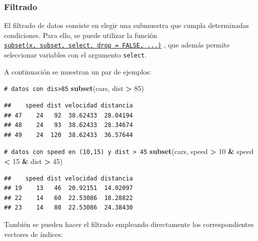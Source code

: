 \documentclass[
]{book}
\newenvironment{Shaded}{\begin{snugshade}}{\end{snugshade}}
\newcommand{\CommentTok}[1]{\textcolor[rgb]{0.56,0.35,0.01}{\textit{#1}}}
\newcommand{\DecValTok}[1]{\textcolor[rgb]{0.00,0.00,0.81}{#1}}
\newcommand{\FunctionTok}[1]{\textcolor[rgb]{0.13,0.29,0.53}{\textbf{#1}}}
\newcommand{\NormalTok}[1]{#1}
\newcommand{\OtherTok}[1]{\textcolor[rgb]{0.56,0.35,0.01}{#1}}
\newcommand{\SpecialCharTok}[1]{\textcolor[rgb]{0.81,0.36,0.00}{\textbf{#1}}}
\theoremstyle{break}
\theoremstyle{nonumberplain}
\renewcommand{\CommentTok}[1]{\textcolor[rgb]{0.41,0.41,0.41}{\texttt{#1}}}
\begin{document}
\subsubsection{Filtrado}\label{filtrado}

El filtrado de datos consiste en elegir una submuestra que cumpla determinadas condiciones. Para ello, se puede utilizar la función \href{https://www.rdocumentation.org/packages/base/versions/3.6.1/topics/subset}{\texttt{subset(x,\ subset,\ select,\ drop\ =\ FALSE,\ ...)}} , que además permite seleccionar variables con el argumento \texttt{select}.

A continuación se muestran un par de ejemplos:

\begin{Shaded}
\begin{Highlighting}[]
\CommentTok{\# datos con dis\textgreater{}85}
\FunctionTok{subset}\NormalTok{(cars, dist }\SpecialCharTok{\textgreater{}} \DecValTok{85}\NormalTok{) }
\end{Highlighting}
\end{Shaded}

\begin{verbatim}
##    speed dist velocidad distancia
## 47    24   92  38.62433  28.04194
## 48    24   93  38.62433  28.34674
## 49    24  120  38.62433  36.57644
\end{verbatim}

\begin{Shaded}
\begin{Highlighting}[]
\CommentTok{\# datos con speed en (10,15) y dist \textgreater{} 45}
\FunctionTok{subset}\NormalTok{(cars, speed }\SpecialCharTok{\textgreater{}} \DecValTok{10} \SpecialCharTok{\&}\NormalTok{ speed }\SpecialCharTok{\textless{}} \DecValTok{15} \SpecialCharTok{\&}\NormalTok{ dist }\SpecialCharTok{\textgreater{}} \DecValTok{45}\NormalTok{)}
\end{Highlighting}
\end{Shaded}

\begin{verbatim}
##    speed dist velocidad distancia
## 19    13   46  20.92151  14.02097
## 22    14   60  22.53086  18.28822
## 23    14   80  22.53086  24.38430
\end{verbatim}

También se pueden hacer el filtrado empleando directamente los
correspondientes vectores de índices:

\begin{Shaded}
\end{Shaded}
\end{document}
